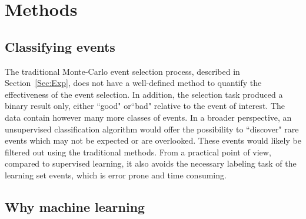 \documentclass[review,number,sort&compress]{elsarticle}
\begin{document}
\section{Methods}\label{sec:methods}

\subsection{Classifying  events} 
The traditional Monte-Carlo event selection process, described in Section~\ref{Sec:Exp}, does not have a well-defined method to quantify the effectiveness of the event selection.
In addition, the selection task produced a binary result only, either ``good" or``bad" relative to the event of interest. The data contain however many more classes of events.%
In a broader perspective, an unsupervised classification algorithm would offer the possibility to ``discover" rare events which may not be expected or are overlooked. These events would likely be filtered out using the traditional methods. From a practical point of view, compared to supervised learning, it also avoids the necessary labeling task of the learning set events, which is error prone and time consuming.

\subsection{Why machine learning}
\end{document}
